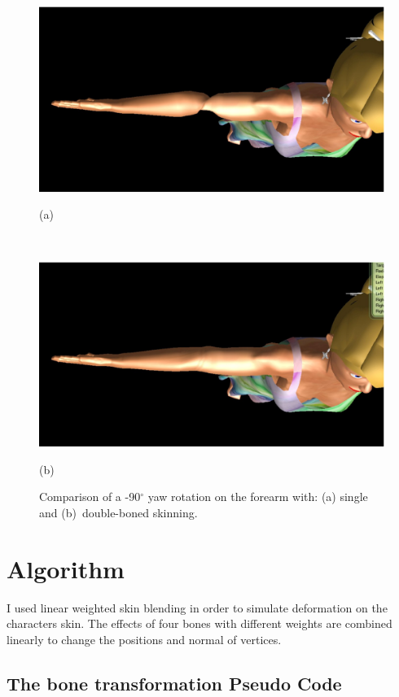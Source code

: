 \begin{figure}[htbp]
	\centerline{\includegraphics[width=1.0\columnwidth]{./figures/fore-arm-single-bone.eps}}
	\centerline{(a)}
	\centerline{\ }
	\centerline{\includegraphics[width=1.0\columnwidth]{./figures/fore-arm-double-bone.eps}}
	\centerline{(b)}
	\caption{Comparison of a -90$^\circ$ yaw rotation on the forearm with: (a) single and (b)~double-boned skinning.}
	\label{fig:forearm-comparison}
\end{figure}

\section{Algorithm}
\label{section2_5}

I used linear weighted skin blending \cite{Kavan2003} in order to simulate deformation on the characters skin. The effects of four bones with different weights are combined linearly to change the positions and normal of vertices.

\subsection{The bone transformation Pseudo Code}

